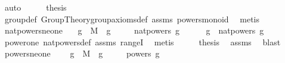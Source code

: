 \begin{isabellebody}
\ auto\isanewline
\ \ \isamarkupfalse%
\ \isamarkupfalse%
\ {\isacharquery}{\kern0pt}thesis\ \isamarkupfalse%
\ group{\isacharunderscore}{\kern0pt}def\ Group{\isacharunderscore}{\kern0pt}Theory{\isachardot}{\kern0pt}group{\isacharunderscore}{\kern0pt}axioms{\isacharunderscore}{\kern0pt}def\ assms\ powers{\isacharunderscore}{\kern0pt}monoid\ \isamarkupfalse%
\ metis\isanewline
{}\isamarkupfalse%
%
\endisatagproof
{\isafoldproof}%
%
\isadelimproof
\isanewline
%
\endisadelimproof
\isanewline
{}\isamarkupfalse%
\ nat{\isacharunderscore}{\kern0pt}powers{\isacharunderscore}{\kern0pt}ne{\isacharunderscore}{\kern0pt}one{\isacharcolon}{\kern0pt}\isanewline
\ \ \ {\isachardoublequoteopen}g\ {\isasymin}\ M{\isachardoublequoteclose}\ \ {\isachardoublequoteopen}g\ {\isasymnoteq}\ {\isasymone}{\isachardoublequoteclose}\isanewline
\ \ \ {\isachardoublequoteopen}nat{\isacharunderscore}{\kern0pt}powers\ g\ {\isasymnoteq}\ {\isacharbraceleft}{\kern0pt}{\isasymone}{\isacharbraceright}{\kern0pt}{\isachardoublequoteclose}\isanewline
%
\isadelimproof
%
\endisadelimproof
%
\isatagproof
{}\isamarkupfalse%
{\isacharminus}{\kern0pt}\isanewline
\ \ \isamarkupfalse%
\ {\isachardoublequoteopen}g\ {\isasymin}\ nat{\isacharunderscore}{\kern0pt}powers\ g{\isachardoublequoteclose}\ \isamarkupfalse%
\ power{\isacharunderscore}{\kern0pt}one\ nat{\isacharunderscore}{\kern0pt}powers{\isacharunderscore}{\kern0pt}def\ assms\ rangeI\ \isamarkupfalse%
\ metis\isanewline
\ \ \isamarkupfalse%
\ \isamarkupfalse%
\ {\isacharquery}{\kern0pt}thesis\ \isamarkupfalse%
\ assms\ \isamarkupfalse%
\ blast\isanewline
{}\isamarkupfalse%
%
\endisatagproof
{\isafoldproof}%
%
\isadelimproof
\isanewline
%
\endisadelimproof
\isanewline
{}\isamarkupfalse%
\ powers{\isacharunderscore}{\kern0pt}ne{\isacharunderscore}{\kern0pt}one{\isacharcolon}{\kern0pt}\ \isanewline
\ \ \ {\isachardoublequoteopen}g\ {\isasymin}\ M{\isachardoublequoteclose}\ \ {\isachardoublequoteopen}g\ {\isasymnoteq}\ {\isasymone}{\isachardoublequoteclose}\isanewline
\ \ \ {\isachardoublequoteopen}powers\ g\ {\isasymnoteq}\ {\isacharbraceleft}{\kern0pt}{\isasymone}{\isacharbraceright}{\kern0pt}{\isachardoublequoteclose}%
\isadelimproof
\ %
\endisadelimproof
%
\isatagproof
{}\isamarkupfalse%

\end{isabellebody}
